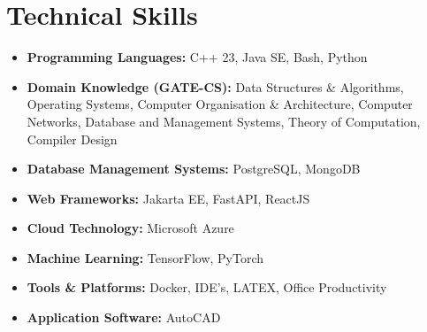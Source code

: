 \documentclass[a4paper,11pt]{article}
\begin{document}
\section*{\textbf{Technical Skills}}
\begin{itemize}
    \item \textbf{Programming Languages:} C++ 23, Java SE, Bash, Python
    \item \textbf{Domain Knowledge (GATE-CS):} 
          Data Structures \& Algorithms, Operating Systems, Computer Organisation \& Architecture,
          Computer Networks, Database and Management Systems, Theory of Computation,
          Compiler Design
    \item \textbf{Database Management Systems:} PostgreSQL, MongoDB
    \item \textbf{Web Frameworks:} Jakarta EE, FastAPI, ReactJS
    \item \textbf{Cloud Technology:} Microsoft Azure
    \item \textbf{Machine Learning:} TensorFlow, PyTorch
    \item \textbf{Tools \& Platforms:} Docker, IDE's, LATEX, Office Productivity
    \item \textbf{Application Software:} AutoCAD
\end{itemize}

\end{document}
